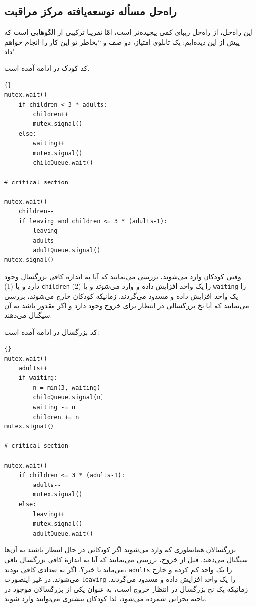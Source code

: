 \documentclass{book}
\newcommand{\clearemptydoublepage}{}%
\begin{document}
\clearemptydoublepage
\subsection {راه‌حل مسأله توسعه‌یافته مرکز مراقبت}

    این راه‌حل، از را‌ه‌حل زیبای  کمی پیچیده‌تر است، امّا تقریبا ترکیبی از الگوهایی است که پیش از این  دیده‌ایم: یک تابلوی امتیاز، دو صف و 
    ‍‍‍‍‍``بخاطر تو این کار را انجام خواهم داد".

    کد کودک در ادامه آمده است. 

\begin{latin}
\begin{lstlisting}[title=\rl{راه‌حل توسعه‌یافته مرکز مراقبت از کودکان (کودک)}]{}
mutex.wait()
    if children < 3 * adults:
        children++
        mutex.signal()
    else:
        waiting++
        mutex.signal()
        childQueue.wait()

# critical section

mutex.wait()
    children--
    if leaving and children <= 3 * (adults-1):
        leaving--
        adults--
        adultQueue.signal() 
mutex.signal()
\end{lstlisting}
\end{latin}

    وقتی کودکان وارد می‌شوند، بررسی می‌نمایند که آیا به اندازه کافی بزرگسال وجود دارد و یا  (1) {\tt children} را یک واحد افزایش داده و وارد می‌شوتد و 
    یا (2) {\tt waiting}  را یک واحد افزایش داده و مسدود می‌گردند. زمانیکه کودکان خارج می‌شوند، بررسی می‌نمایند که آیا نخ بزرگسالی در انتظار برای خروج 
    وجود دارد و اگر مقدور باشد به آن سیگنال می‌دهند. 
    
\newpage
    کد بزرگسال در ادامه آمده است:

\begin{latin}
\begin{lstlisting}[title=\rl{راه‌حل توسعه‌یافته مرکز مراقبت از کودکان (بزرگسال)}]{}
mutex.wait()
    adults++
    if waiting:
        n = min(3, waiting)
        childQueue.signal(n)
        waiting -= n
        children += n
mutex.signal()

# critical section

mutex.wait()
    if children <= 3 * (adults-1):
        adults--
        mutex.signal()
    else:
        leaving++
        mutex.signal()
        adultQueue.wait() 
\end{lstlisting}
\end{latin}

    بزرگسالان همانطوری که وارد می‌شوند اگر کودکانی در حال انتظار باشند به آن‌ها سیگنال می‌دهند. قبل از خروج، بررسی می‌نمایند که آیا به اندازهٔ کافی بزرگسال 
    باقی می‌ماند یا خیر؟. اگر به تعدادی کافی بودند، {\tt adults} را یک واحد کم کرده و خارج می‌شوند. در غیر اینصورت {\tt leaving} را یک واحد افزایش 
    داده و مسدود می‌گردند. زمانیکه یک نخ بزرگسال در انتظار خروج است، به عنوان یکی از بزرگسالان موجود در ناحیه بحرانی شمرده می‌شود، لذا کودکان 
    بیشتری می‌توانند وارد شوند.     
\end{document}
